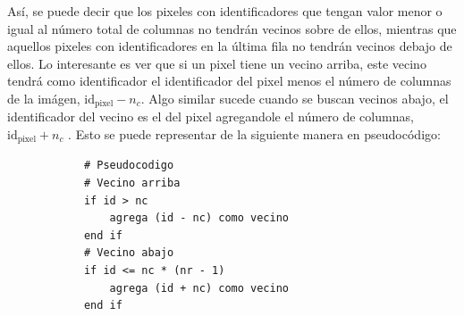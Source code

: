 \begin{enumerate}
\begin{solution}
        Así, se puede decir que los pixeles con identificadores que tengan valor menor o igual al número total de columnas no tendrán vecinos sobre de ellos, mientras que aquellos pixeles con identificadores en la última fila no tendrán vecinos debajo de ellos. Lo interesante es ver que si un pixel tiene un vecino arriba, este vecino tendrá como identificador el identificador del pixel menos el número de columnas de la imágen, $\text{id}_{\text{pixel}} - n_c$. Algo similar sucede cuando se buscan vecinos abajo, el identificador del vecino es el del pixel agregandole el número de columnas, $\text{id}_{\text{pixel}} + n_c$ . Esto se puede representar de la siguiente manera en pseudocódigo:
        \begin{verbatim}
            # Pseudocodigo
            # Vecino arriba
            if id > nc
                agrega (id - nc) como vecino
            end if
            # Vecino abajo
            if id <= nc * (nr - 1)
                agrega (id + nc) como vecino
            end if
        \end{verbatim}


\end{solution}
\end{enumerate}
